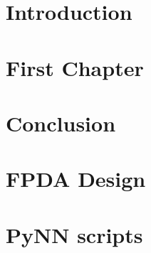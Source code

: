\documentclass[12pt,twoside]{report}
\begin{document}
\chapter{Introduction}



\chapter{First Chapter}



\chapter{Conclusion}



\appendix
\chapter{FPDA Design}


\chapter{PyNN scripts}


\printbibliography
\end{document}
